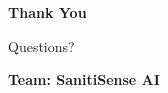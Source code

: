 \documentclass[aspectratio=169]{beamer}
\begin{document}
\begin{frame}
\begin{center}
\Huge{\textbf{Thank You}}

\vspace{1cm}

\Large{Questions?}

\vspace{1cm}

\normalsize{\textbf{Team: SanitiSense AI}}
\end{center}
\end{frame}
\end{document}
